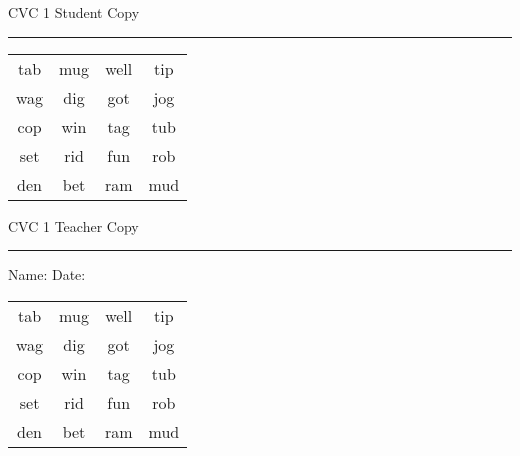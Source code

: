 \documentclass{memoir}
\begin{document}

\footnotesize \noindent
CVC 1 \hfill Student Copy
\smallskip
\hrule

\Large

\setlength{\tabcolsep}{14pt}
\def\arraystretch{2}

{\selectfont


\begin{vplace}[0.5]
\begin{center}
\begin{tabular}{cccc}
tab & mug & well & tip \\
wag & dig & got & jog \\
cop & win & tag & tub \\
set & rid & fun & rob \\
den & bet & ram & mud \\
\end{tabular}
\end{center}
\end{vplace}

}

\newpage

\footnotesize \noindent
CVC 1 \hfill Teacher Copy
\smallskip
\hrule

\small

\vfill

\noindent
Name: \underline{\hspace{1.75in}} \hfill Date: \underline{\hspace{1in}}

\Large

{\selectfont


\begin{vplace}[0.5]
\begin{center}
\begin{tabular}{cccc}
tab & mug & well & tip \\
wag & dig & got & jog \\
cop & win & tag & tub \\
set & rid & fun & rob \\
den & bet & ram & mud \\
\end{tabular}
\end{center}
\end{vplace}



}
\end{document}
